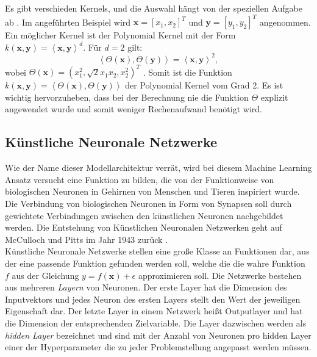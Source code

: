 Es gibt verschieden Kernels, und die Auswahl h\"angt von der speziellen Aufgabe ab \cite{SVM1}. Im angef\"uhrten Beispiel wird $ \mathbf{x} = [x_1, x_2]^T$ und $\mathbf{y} = [y_1, y_2]^T$ angenommen.
Ein m\"oglicher Kernel ist der Polynomial Kernel mit der Form 
$k(\mathbf{x}, \mathbf{y}) = \left\langle \mathbf{x}, \mathbf{y} \right\rangle^d$. F\"ur $d=2$ gilt:
$$ \left\langle \Theta(\mathbf{x}), \Theta(\mathbf{y}) \right\rangle = \left\langle \mathbf{x}, \mathbf{y} \right\rangle^2, $$
wobei $\Theta(\mathbf{x}) = (x_1^2, \sqrt{2}x_1x_2, x_2^2)^T$ \cite{handson}. 
Somit ist die Funktion $k(\mathbf{x}, \mathbf{y}) = \left\langle \Theta(\mathbf{x}), \Theta(\mathbf{y}) \right\rangle$
der Polynomial Kernel vom Grad 2. Es ist wichtig hervorzuheben, dass bei der Berechnung nie die Funktion $\Theta$ explizit angewendet wurde \cite{handson}
und somit weniger Rechenaufwand ben\"otigt wird. \\































\subsection{K\"unstliche Neuronale Netzwerke}
Wie der Name dieser Modellarchitektur verr\"at, wird bei diesem Machine Learning Ansatz versucht eine Funktion zu bilden, die von der Funktionweise
von biologischen Neuronen in Gehirnen von Menschen und Tieren inspiriert wurde. Die Verbindung von biologischen Neuronen in Form von Synapsen soll durch gewichtete
Verbindungen zwischen den k\"unstlichen Neuronen nachgebildet werden. Die Entstehung von K\"unstlichen Neuronalen Netzwerken 
geht auf McCulloch und Pitts im Jahr 1943 zur\"uck \cite{McCulloch}. \\

K\"unstliche Neuronale Netzwerke stellen eine gro{\ss}e Klasse an Funktionen dar, aus der eine passende Funktion gefunden werden soll, welche die 
die wahre Funktion $f$ aus der Gleichung $y = f(\mathbf{x}) + \epsilon$ approximieren soll. Die Netzwerke bestehen aus mehreren \textit{Layern} von Neuronen. Der erste Layer hat 
die Dimension des Inputvektors und jedes Neuron des ersten Layers stellt den Wert der jeweiligen Eigenschaft dar. Der letzte Layer in einem Netzwerk hei{\ss}t 
Outputlayer und hat die Dimension der entsprechenden Zielvariable. Die Layer dazwischen werden als \textit{hidden Layer} bezeichnet und sind mit der Anzahl von Neuronen pro 
hidden Layer einer der Hyperparameter die zu jeder Problemstellung angepasst werden m\"ussen. \\

